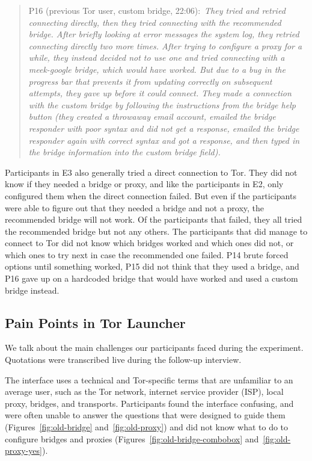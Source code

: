 \documentclass[USenglish,oneside,twocolumn]{article}
\newcommand{\pquote}[2]{
\begin{quotation}
\noindent #1:~\textit{#2}
\end{quotation}
}
\begin{document}
\pquote{P16 (previous Tor user, custom bridge, 22:06)}{They tried and retried connecting directly, then they tried connecting with the recommended bridge. After briefly looking at error messages the system log, they retried connecting directly two more times. After trying to configure a proxy for a while, they instead decided not to use one and tried connecting with a meek-google bridge, which would have worked. But  due to a bug in the progress bar that prevents it from updating correctly on subsequent attempts, they gave up before it could connect. They made a connection with the custom bridge by following the instructions from the bridge help button (they created a throwaway email account, emailed the bridge responder with poor syntax and did not get a response, emailed the bridge responder again with correct syntax and got a response, and then typed in the bridge information into the custom bridge field).}

Participants in E3 also generally tried a direct connection to Tor. They did not know if they needed a bridge or proxy, and like the participants in E2, only configured them when the direct connection failed. But even if the participants were able to figure out that they needed a bridge and not a proxy, the recommended bridge will not work. Of the participants that failed, they all tried the recommended bridge but not any others. The participants that did manage to connect to Tor did not know which bridges worked and which ones did not, or which ones to try next in case the recommended one failed. P14 brute forced options until something worked, P15 did not think that they used a bridge, and P16 gave up on a hardcoded bridge that would have worked and used a custom bridge instead.

\subsection{Pain Points in Tor Launcher} 
\label{sec:pain-points}
We talk about the main challenges our participants faced during the experiment. 
Quotations were transcribed live during the follow-up interview.

The interface uses a technical and Tor-specific terms that are unfamiliar to an average user, such as the Tor network, internet service provider (ISP), local proxy, bridges, and transports. Participants found the interface confusing, and were often unable to answer the questions that were designed to guide them (Figures~\ref{fig:old-bridge} and~\ref{fig:old-proxy}) and did not know what to do to configure bridges and proxies (Figures~\ref{fig:old-bridge-combobox} and~\ref{fig:old-proxy-yes}).
\end{document}
